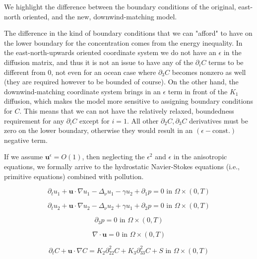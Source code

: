 \documentclass[11pt]{article}
\begin{document}
We highlight the difference between the boundary conditions of the original, east-north oriented, and the new, downwind-matching model.

The difference in the kind of boundary conditions that we can "afford" to have on the lower boundary for the concentration comes from the energy inequality. In the east-north-upwards oriented coordinate system we do not have an $\epsilon$ in the diffusion matrix, and thus it is not an issue to have any of the $\partial_i C$ terms to be different from 0, not even for an ocean case where $\partial_3 C$ becomes nonzero as well (they are required however to be bounded of course). On the other hand, the downwind-matching coordinate system brings in an $\epsilon$ term in front of the $K_1$ diffusion, which makes the model more sensitive to assigning boundary conditions for $C.$ This means that we can not have the relatively relaxed, boundedness requirement for any $\partial_i C$ except for $i=1.$ All other $\partial_2 C, \partial_3 C$ derivatives must be zero on the lower boundary, otherwise they would result in an $(\epsilon - \text{const.})$ negative term.

If we assume $\mathbf{u}^\epsilon = O(1)$, then neglecting the $\epsilon^2$ and $\epsilon$ in the anisotropic equations, we formally arrive to the hydrostatic Navier-Stokes equations (i.e., primitive equations) combined with pollution.

    \begin{equation} \label{HNSC1}    
    \partial_t u_1 + \mathbf{u} \cdot \nabla u_1 - \Delta_\nu u_1 -\gamma u_2 + \partial_1 p = 0 \text{ in } \Omega \times (0,T)
    \end{equation}
    
    \begin{equation} \label{HNSC2}   
    \partial_t u_2 + \mathbf{u} \cdot \nabla u_2 - \Delta_\nu u_2 + \gamma u_1 + \partial_2 p = 0 \text{ in } \Omega \times (0,T)
    \end{equation}
    
    \begin{equation} \label{HNSC3}   
    \partial_3 p = 0 \text{ in } \Omega \times (0,T)
    \end{equation}
    
    \begin{equation} \label{HNSC4}   
    \nabla \cdot \mathbf{u} = 0 \text{ in } \Omega \times (0,T)
    \end{equation}
    
    \begin{equation} \label{HNSC5}   
    \partial_t C + \mathbf{u} \cdot \nabla C = K_2 \partial_{22} ^ 2 C + K_3 \partial_{33} ^2 C + S \text{ in } \Omega \times (0,T)
    \end{equation}
    
\end{document}

